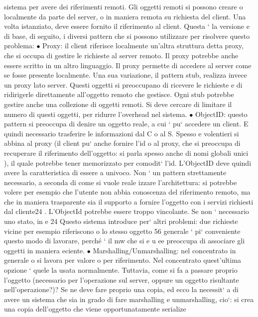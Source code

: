 \documentclass[a4paper,12pt]{article}
\begin{document}
sistema per avere dei riferimenti remoti. Gli oggetti remoti si possono creare o
localmente da parte del server, o in maniera remota su richiesta del client. Una
volta istanziato, deve essere fornito il riferimento al client. Questa ` la versione
e
di base, di seguito, i diversi pattern che si possono utilizzare per risolvere questo
problema:
$\bullet$ Proxy: il client riferisce localmente un'altra struttura detta proxy, che si
occupa di gestire le richieste al server remoto. Il proxy potrebbe anche
essere scritto in un altro linguaggio. Il proxy permette di accedere al server
come se fosse presente localmente.
Una sua variazione, il pattern stub, realizza invece un proxy lato server.
Questi oggetti si preoccupano di ricevere le richieste e di ridirigerle direttamente all'oggetto remoto che gestisce.
Ogni stub potrebbe gestire anche
una collezione di oggetti remoti.
Si deve cercare di limitare il numero di questi oggetti, per ridurre l'overhead nel sistema.
$\bullet$ ObjectID: questo pattern si preoccupa di denire un oggetto reale, a cui
`
pu` accedere un client. E quindi necessario trasferire le informazioni dal C
o
al S. Spesso e volentieri si abbina al proxy (il client pu` anche fornire l'id
o
al proxy, che si preoccupa di recuperare il riferimento dell'oggetto: si parla
spesso anche di nomi globali unici ), il quale potrebbe tener memorizzato
per comodit` l'id. L'ObjectID deve quindi avere la caratteristica di essere
a
univoco.
Non ` un pattern strettamente necessario, a seconda di come si vuole reale
izzare l'architettura: si potrebbe volere per esempio che l'utente non abbia
conoscenza del riferimento remoto, ma che in maniera trasparente sia il
supporto a fornire l'oggetto con i servizi richiesti dal cliente24 . L'ObjectId potrebbe essere troppo vincolante. Se
non ` necessario uno stato, in
e
24 Questo sistema introduce per` altri problemi: due richieste vicine per esempio riferiscono
o
lo stesso oggetto
56
\newpage
generale ` pi` conveniente questo modo di lavorare, perché ` il mw che si
e u
ee
preoccupa di associare gli oggetti in maniera eciente.
$\bullet$ Marshalling/Unmarshalling: nel concentrato in generale o si lavora per
valore o per riferimento. Nel concentrato quest'ultima opzione ` quele
la usata normalmente. Tuttavia, come si fa a passare proprio l'oggetto
(necessario per l'operazione sul server, oppure un oggetto risultante nell'operazione?)? Se ne deve fare proprio una
copia, ed ecco la necessit`
a
di avere un sistema che sia in grado di fare marshalling e unmarshalling,
cio`: si crea una copia dell'oggetto che viene opportunatamente serialize
\end{document}

